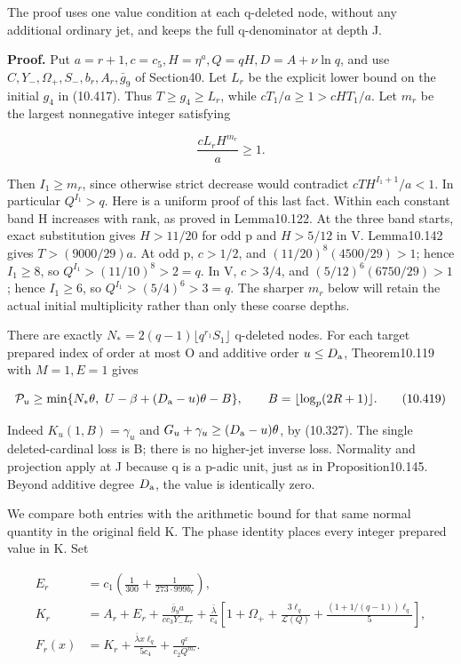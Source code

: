 \documentclass[
  11pt,
  a4paper,
]{article}
\begin{document}
The proof uses one value condition at each q-deleted node, without any
additional ordinary jet, and keeps the full q-denominator at depth J.

\textbf{Proof.} Put \(a=r+1,c=c_5,H=\eta^a,Q=qH,D=A+\nu\ln q\), and use
\(C,Y_-,\Omega_+,S_-,b_r,A_r,\bar g_9\) of Section40. Let \(L_r\) be the
explicit lower bound on the initial \(g_4\) in (10.417). Thus
\(T\ge g_4\ge L_r\), while \(cT_1/a\ge1>cHT_1/a\). Let \(m_r\) be the
largest nonnegative integer satisfying

\[
\frac{cL_rH^{m_r}}a\ge1.
\tag{10.418}
\]

Then \(I_1\ge m_r\), since otherwise strict decrease would contradict
\(cTH^{I_1+1}/a<1\). In particular \(Q^{I_1}>q\). Here is a uniform
proof of this last fact. Within each constant band H increases with
rank, as proved in Lemma10.122. At the three band starts, exact
substitution gives \(H>11/20\) for odd p and \(H>5/12\) in V.
Lemma10.142 gives \(T>(9000/29)a\). At odd p, \(c>1/2\), and
\((11/20)^8(4500/29)>1\); hence \(I_1\ge8\), so
\(Q^{I_1}>(11/10)^8>2=q\). In V, \(c>3/4\), and \((5/12)^6(6750/29)>1\);
hence \(I_1\ge6\), so \(Q^{I_1}>(5/4)^6>3=q\). The sharper \(m_r\) below
will retain the actual initial multiplicity rather than only these
coarse depths.

There are exactly \(N_*=2(q-1)\lfloor q^{r_1}S_1\rfloor\) q-deleted
nodes. For each target prepared index of order at most O and additive
order \(u\le D_{\rm a}\), Theorem10.119 with \(M=1,E=1\) gives

\[
\mathcal P_u\ge
\min\{N_*\theta,\ U-\beta+(D_{\rm a}-u)\theta-B\},
\qquad B=\lfloor\log_p(2R+1)\rfloor.
\tag{10.419}
\]

Indeed \(K_u(1,B)=\gamma_u\) and \(G_u+\gamma_u\ge(D_{\rm a}-u)\theta\),
by (10.327). The single deleted-cardinal loss is B; there is no
higher-jet inverse loss. Normality and projection apply at J because q
is a p-adic unit, just as in Proposition10.145. Beyond additive degree
\(D_{\rm a}\), the value is identically zero.

We compare both entries with the arithmetic bound for that same normal
quantity in the original field K. The phase identity places every
integer prepared value in K. Set

\[
\begin{aligned}
E_r&=c_1\left(\frac1{300}+\frac1{273\cdot999b_r}\right),\\
K_r&=A_r+E_r+\frac{\bar g_9a}{cc_3Y_-L_r}
 +\frac{\bar\lambda}{c_4}
 \left[1+\Omega_++\frac{3\ell_q}{\mathcal L(Q)}
  +\frac{(1+1/(q-1))\ell_q}{5}\right],\\
F_r(x)&=K_r+\frac{\bar\lambda x\ell_q}{5c_4}
       +\frac{q^x}{c_2Q^{m_r}}.
\end{aligned}
\tag{10.420}
\]
\end{document}
